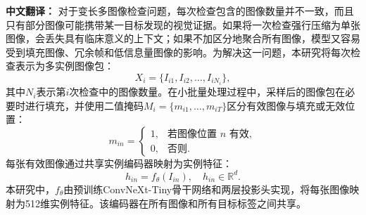 \documentclass[Afour,sagev,times]{sagej}
\begin{document}
\textbf{中文翻译：} 对于变长多图像检查问题，每次检查包含的图像数量并不一致，而且只有部分图像可能携带某一目标发现的视觉证据。如果将一次检查强行压缩为单张图像，会丢失具有临床意义的上下文；如果不加区分地聚合所有图像，模型又容易受到填充图像、冗余帧和低信息量图像的影响。为解决这一问题，本研究将每次检查表示为多实例图像包：
\begin{equation}
X_i=\{I_{i1}, I_{i2}, \ldots, I_{iN_i}\},
\end{equation}
其中$N_i$表示第$i$次检查中的图像数量。在小批量处理过程中，采样后的图像包在必要时进行填充，并使用二值掩码$M_i=\{m_{i1},\ldots,m_{iT}\}$区分有效图像与填充或无效位置：
\begin{equation}
m_{in} =
\begin{cases}
1, & \text{若图像位置 } n \text{ 有效},\\
0, & \text{否则}.
\end{cases}
\end{equation}
每张有效图像通过共享实例编码器映射为实例特征：
\begin{equation}
h_{in}=f_{\theta}(I_{in}), \quad h_{in}\in \mathbb{R}^{d}.
\end{equation}
本研究中，$f_{\theta}$由预训练ConvNeXt-Tiny骨干网络和两层投影头实现，将每张图像映射为512维实例特征。该编码器在所有图像和所有目标标签之间共享。
\end{document}
